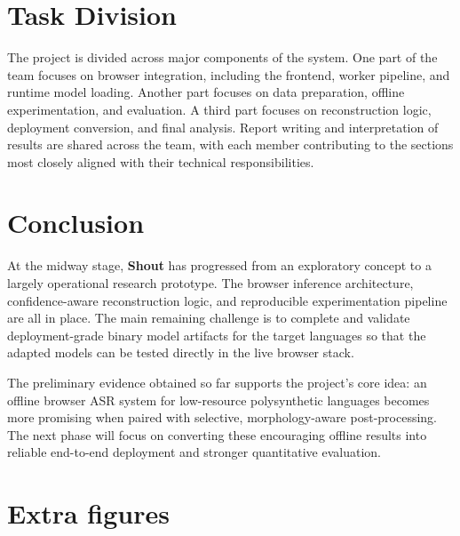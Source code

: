 \documentclass[11pt]{article}
\begin{document}
\section{Task Division}
The project is divided across major components of the system. One part of the team focuses on browser integration, including the frontend, worker pipeline, and runtime model loading. Another part focuses on data preparation, offline experimentation, and evaluation. A third part focuses on reconstruction logic, deployment conversion, and final analysis. Report writing and interpretation of results are shared across the team, with each member contributing to the sections most closely aligned with their technical responsibilities.

\section{Conclusion}
At the midway stage, \textbf{Shout} has progressed from an exploratory concept to a largely operational research prototype. The browser inference architecture, confidence-aware reconstruction logic, and reproducible experimentation pipeline are all in place. The main remaining challenge is to complete and validate deployment-grade binary model artifacts for the target languages so that the adapted models can be tested directly in the live browser stack.

The preliminary evidence obtained so far supports the project's core idea: an offline browser ASR system for low-resource polysynthetic languages becomes more promising when paired with selective, morphology-aware post-processing. The next phase will focus on converting these encouraging offline results into reliable end-to-end deployment and stronger quantitative evaluation.


\appendix
\section{Extra figures}

\end{document}

